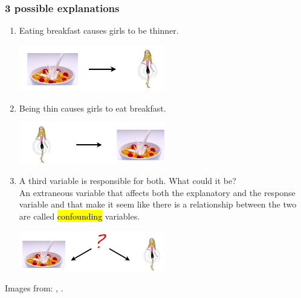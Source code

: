 \begin{frame}[shrink]
\frametitle{3 possible explanations}

\pause

\begin{enumerate}

\item Eating breakfast causes girls to be thinner.
\begin{center}
\includegraphics[width=0.5\textwidth]{1-4_obs_studies_sampling/figures/breakfast/breakfast2}
\end{center}

\pause

\item Being thin causes girls to eat breakfast.
\begin{center}
\includegraphics[width=0.5\textwidth]{1-4_obs_studies_sampling/figures/breakfast/breakfast3}
\end{center}

\pause

\item A third variable is responsible for both. What could it be? \\
An extraneous variable that affects both the explanatory and the response variable and that make it seem like there is a relationship between the two are called \hl{confounding} variables.
\begin{center}
\includegraphics[width=0.5\textwidth]{1-4_obs_studies_sampling/figures/breakfast/breakfast4}
\end{center}

\end{enumerate}


{\tiny Images from: ,  .}



\end{frame}

